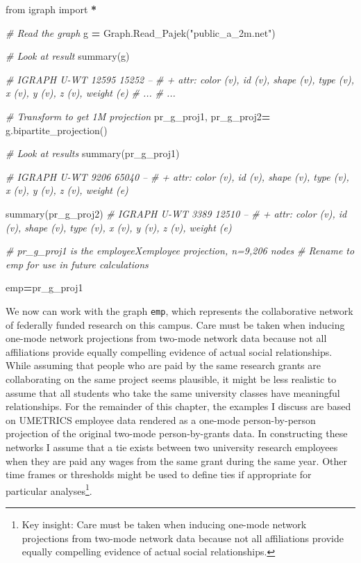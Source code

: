 \documentclass[]{krantz}
\newenvironment{Shaded}{\begin{snugshade}}{\end{snugshade}}
\newcommand{\StringTok}[1]{\textcolor[rgb]{0.31,0.60,0.02}{#1}}
\newcommand{\ImportTok}[1]{#1}
\newcommand{\CommentTok}[1]{\textcolor[rgb]{0.56,0.35,0.01}{\textit{#1}}}
\newcommand{\OperatorTok}[1]{\textcolor[rgb]{0.81,0.36,0.00}{\textbf{#1}}}
\newcommand{\NormalTok}[1]{#1}
\begin{document}
\begin{Shaded}
\begin{Highlighting}[]
\ImportTok{from}\NormalTok{ igraph }\ImportTok{import} \OperatorTok{*}

\CommentTok{# Read the graph}
\NormalTok{g }\OperatorTok{=}\NormalTok{ Graph.Read_Pajek(}\StringTok{"public_a_2m.net"}\NormalTok{)}

\CommentTok{# Look at result}
\NormalTok{summary(g)}


\CommentTok{# IGRAPH U-WT 12595 15252 --}
\CommentTok{# + attr: color (v), id (v), shape (v), type (v), x (v), y (v), z (v), weight (e)}
\CommentTok{# ...}
\CommentTok{# ...}

\CommentTok{# Transform to get 1M projection}
\NormalTok{pr_g_proj1, pr_g_proj2}\OperatorTok{=}\NormalTok{ g.bipartite_projection()}

\CommentTok{# Look at results}
\NormalTok{summary(pr_g_proj1)}

\CommentTok{# IGRAPH U-WT 9206 65040 --}
\CommentTok{# + attr: color (v), id (v), shape (v), type (v), x (v), y (v), z (v), weight (e)}

\NormalTok{summary(pr_g_proj2)}
\CommentTok{# IGRAPH U-WT 3389 12510 --}
\CommentTok{# + attr: color (v), id (v), shape (v), type (v), x (v), y (v), z (v), weight (e)}

\CommentTok{# pr_g_proj1 is the employeeXemployee projection, n=9,206 nodes}
\CommentTok{# Rename to emp for use in future calculations}

\NormalTok{emp}\OperatorTok{=}\NormalTok{pr_g_proj1}
\end{Highlighting}
\end{Shaded}

We now can work with the graph \texttt{emp}, which represents the
collaborative network of federally funded research on this campus. Care
must be taken when inducing one-mode network projections from two-mode
network data because not all affiliations provide equally compelling
evidence of actual social relationships. While assuming that people who
are paid by the same research grants are collaborating on the same
project seems plausible, it might be less realistic to assume that all
students who take the same university classes have meaningful
relationships. For the remainder of this chapter, the examples I discuss
are based on UMETRICS employee data rendered as a one-mode
person-by-person projection of the original two-mode person-by-grants
data. In constructing these networks I assume that a tie exists between
two university research employees when they are paid any wages from the
same grant during the same year. Other time frames or thresholds might
be used to define ties if appropriate for particular analyses\footnote{Key
  insight: Care must be taken when inducing one-mode network projections
  from two-mode network data because not all affiliations provide
  equally compelling evidence of actual social relationships.}.
\end{document}
